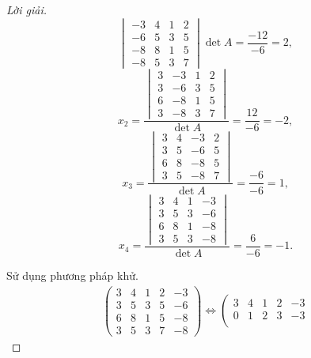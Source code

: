 \documentclass[class=linearalgebra,crop=false]{standalone}
\begin{document}
\begin{proof}[Lời giải]
\[{\begin{vmatrix}
                -3 & 4 & 1 & 2 \\
                -6 & 5 & 3 & 5 \\
                -8 & 8 & 1 & 5 \\
                -8 & 5 & 3 & 7
            \end{vmatrix}
        }{\det A} = \dfrac{-12}{-6} = 2,
    \]
    \[
        x_{2} = \dfrac{
            \begin{vmatrix}
                3 & -3 & 1 & 2 \\
                3 & -6 & 3 & 5 \\
                6 & -8 & 1 & 5 \\
                3 & -8 & 3 & 7
            \end{vmatrix}
        }{\det A} = \dfrac{12}{-6} = -2,
    \]
    \[
        x_{3} = \dfrac{
            \begin{vmatrix}
                3 & 4 & -3 & 2 \\
                3 & 5 & -6 & 5 \\
                6 & 8 & -8 & 5 \\
                3 & 5 & -8 & 7
            \end{vmatrix}
        }{\det A} = \dfrac{-6}{-6} = 1,
    \]
    \[
        x_{4} = \dfrac{
            \begin{vmatrix}
                3 & 4 & 1 & -3 \\
                3 & 5 & 3 & -6 \\
                6 & 8 & 1 & -8 \\
                3 & 5 & 3 & -8
            \end{vmatrix}
        }{\det A} = \dfrac{6}{-6} = -1.
    \]
    \bigskip
    \par Sử dụng phương pháp khử.
    \begingroup
    \allowdisplaybreaks
    \begin{gather*}
        \left(
        \begin{array}{cccc|c}
            3 & 4 & 1 & 2 & -3 \\
            3 & 5 & 3 & 5 & -6 \\
            6 & 8 & 1 & 5 & -8 \\
            3 & 5 & 3 & 7 & -8
        \end{array}
        \right)
        \Longleftrightarrow
        \left(
        \begin{array}{cccc|c}
            3 & 4 & 1  & 2 & -3 \\
            0 & 1 & 2  & 3 & -3 \\

\end{array}
\end{gather*}
\end{proof}
\end{document}
